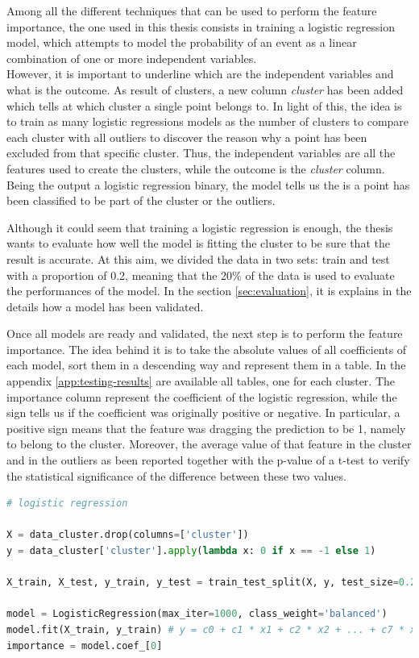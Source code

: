 Among all the different techniques that can be used to perform the feature importance, the one used in this thesis consists in training a logistic regression model, which attempts to model the probability of an event as a linear combination of one or more independent variables.
\\
However, it is important to underline which are the independent variables and what is the outcome. As result of clusters, a new column \textit{cluster} has been added which tells at which cluster a single point belongs to. In light of this, the idea is to train as many logistic regressions models as the number of clusters to compare each cluster with all outliers to discover the reason why a point has been excluded from that specific cluster. Thus, the independent variables are all the features used to create the clusters, while the outcome is the \textit{cluster} column. Being the output a logistic regression binary, the model tells us the is a point has been classified to be part of the cluster or the outliers. 

Although it could seem that training a logistic regression is enough, the thesis wants to evaluate how well the model is fitting the cluster to be sure that the result is accurate. At this aim, we divided the data in two sets: train and test with a proportion of 0.2, meaning that the 20\% of the data is used to evaluate the performances of the model. In the section \ref{sec:evaluation}, it is explains in the details how a model has been validated.

Once all models are ready and validated, the next step is to perform the feature importance. The idea behind it is to take the absolute values of all coefficients of each model, sort them in a descending way and represent them in a table. In the appendix \ref{app:testing-results} are available all tables, one for each cluster. The importance column represent the coefficient of the logistic regression, while the sign tells us if the coefficient was originally positive or negative. In particular, a positive sign means that the feature was dragging the prediction to be 1, namely to belong to the cluster. Moreover, the average value of that feature in the cluster and in the outliers as been reported together with the p-value of a t-test to verify the statistical significance of the difference between these two values. 

\begin{minipage}{\linewidth}
\begin{lstlisting}[language=Python]
# logistic regression

X = data_cluster.drop(columns=['cluster'])
y = data_cluster['cluster'].apply(lambda x: 0 if x == -1 else 1)

X_train, X_test, y_train, y_test = train_test_split(X, y, test_size=0.2, stratify=y)

model = LogisticRegression(max_iter=1000, class_weight='balanced')
model.fit(X_train, y_train) # y = c0 + c1 * x1 + c2 * x2 + ... + c7 * x7
importance = model.coef_[0]
\end{lstlisting}
\end{minipage}

